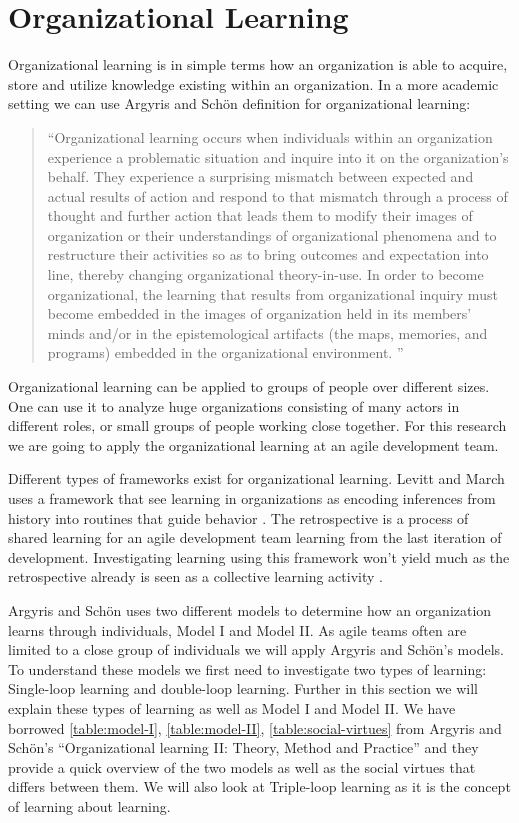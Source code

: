 \section{Organizational Learning}
\label{intro:organizational-learning}
Organizational learning is in simple terms how an organization is able to acquire, store and utilize knowledge existing within an organization. In a more academic setting we can use Argyris and Schön definition \cite{Argyris1996} for organizational learning: 

\begin{quote}
	``Organizational learning occurs when individuals within an organization experience a problematic situation and inquire into it on the organization's behalf. They experience a surprising mismatch between expected and actual results of action and respond to that mismatch through a process of thought and further action that leads them to modify their images of organization or their understandings of organizational phenomena and to restructure their activities so as to bring outcomes and expectation into line, thereby changing organizational theory-in-use. In order to become organizational, the learning that results from organizational inquiry must become embedded in the images of organization held in its members' minds and/or in the epistemological artifacts (the maps, memories, and programs) embedded in the organizational environment. ''
\end{quote}

Organizational learning can be applied to groups of people over different sizes. One can use it to analyze huge organizations consisting of many actors in different roles, or small groups of people working close together. For this research we are going to apply the organizational learning at an agile development team. 

Different types of frameworks exist for organizational learning. Levitt and March uses a framework that see learning in organizations as encoding inferences from history into routines that guide behavior \cite{Levitt1988}. The retrospective is a process of shared learning for an agile development team learning from the last iteration of development. Investigating learning using this framework won't yield much as the retrospective already is seen as a collective learning activity \cite{Dingsoyr2004}. 

Argyris and Schön \cite{Argyris1996} uses two different models to determine how an organization learns through individuals, Model I and Model II. As agile teams often are limited to a close group of individuals we will apply Argyris and Schön's models. To understand these models we first need to investigate two types of learning: Single-loop learning and double-loop learning. Further in this section we will explain these types of learning as well as Model I and Model II. We have borrowed \autoref{table:model-I}, \autoref{table:model-II}, \autoref{table:social-virtues} from Argyris and Schön's ``Organizational learning II: Theory, Method and Practice''\cite{Argyris1996} and they provide a quick overview of the two models as well as the social virtues that differs between them. We will also look at Triple-loop learning as it is the concept of learning about learning. 

